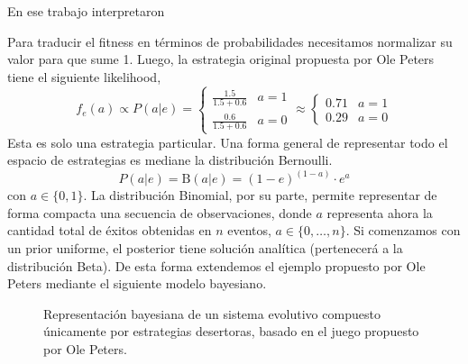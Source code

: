 \documentclass[a4paper,10pt]{article}
\begin{document}
En ese trabajo interpretaron  


\begin{figure}[H]
\centering
{}
\caption{}
\label{fig:modelo_beta_binomial}
\end{figure}


Para traducir el fitness en términos de probabilidades necesitamos normalizar su valor para que sume 1.
Luego, la estrategia original propuesta por Ole Peters tiene el siguiente likelihood,
%
\begin{equation}
f_e(a) \propto  P(a|e) = \begin{cases}
 \frac{1.5}{1.5+0.6} & a = 1 \\
 \frac{0.6}{1.5+0.6} & a = 0
  \end{cases}
  \approx
\begin{cases}
 0.71 & a= 1 \\
 0.29 & a= 0
\end{cases}
\end{equation}
%
Esta es solo una estrategia particular.
Una forma general de representar todo el espacio de estrategias es mediane la distribución Bernoulli.
%
\begin{equation}
P(a|e) = \text{B}(a|e) = (1-e)^{(1-a)} \cdot e^a 
\end{equation}
%
con $a \in \{0,1\}$.
La distribución Binomial, por su parte, permite representar de forma compacta una secuencia de observaciones, donde $a$ representa ahora la cantidad total de éxitos obtenidas en $n$ eventos, $a \in \{0, \dots, n\}$.
Si comenzamos con un prior uniforme, el posterior tiene solución analítica (pertenecerá a la distribución Beta).
De esta forma extendemos el ejemplo propuesto por Ole Peters mediante el siguiente modelo bayesiano.
%
\begin{figure}[H]
\centering
{}
\caption{Representación bayesiana de un sistema evolutivo compuesto únicamente por estrategias desertoras, basado en el juego propuesto por Ole Peters.}
\label{fig:modelo_beta_binomial}
\end{figure}
\end{document}
